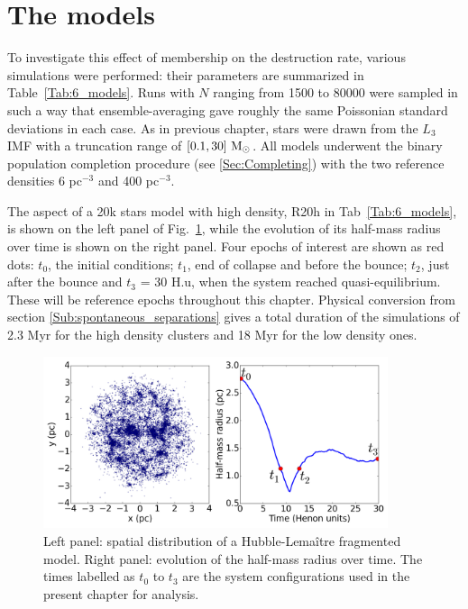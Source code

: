 \section{The models}
\label{Sec:6_models}

To investigate this effect of membership on the destruction rate, various simulations were performed: their parameters are summarized in Table~\ref{Tab:6_models}. Runs with $N$ ranging from 1500 to 80000 were sampled in such a way that ensemble-averaging  gave roughly the same Poissonian standard deviations in each case. As in previous chapter, stars were drawn from the $L_3$ IMF \citep{Maschberger2013} with a truncation range of $[0.1,30]~{\textrm{M}_\odot}$. All models underwent the binary population completion procedure (see \ref{Sec:Completing}) with the two reference densities 6 pc$^{-3}$ and 400 pc$^{-3}$.

The aspect of a 20k stars model with high density, R20h in Tab~\ref{Tab:6_models}, is shown on the left panel of Fig.~\ref{Fig:6_Rhm}, while the evolution of its half-mass radius over time is shown on the right panel. Four epochs of interest are shown as red dots: $t_0$, the initial conditions; $t_1$, end of collapse and before the bounce; $t_2$, just after the bounce and $t_3$ = 30 H.u, when the system reached quasi-equilibrium. These will be reference epochs throughout this chapter. Physical conversion from section \ref{Sub:spontaneous_separations} gives a total duration of the simulations of 2.3 Myr for the high density clusters and 18 Myr for the low density ones.


\begin{figure}
\begin{center}
\includegraphics[width=0.9\textwidth]{Figures/6_Rhm}
\caption[Aspect of the HL model and reference epochs]{Left panel: spatial distribution of a Hubble-Lema\^itre fragmented model. Right panel: evolution of the half-mass radius over time. The times labelled as $t_0$ to $t_3$ are the system configurations used in the present chapter for analysis. }
\label{Fig:6_Rhm}
\end{center}
\end{figure}


